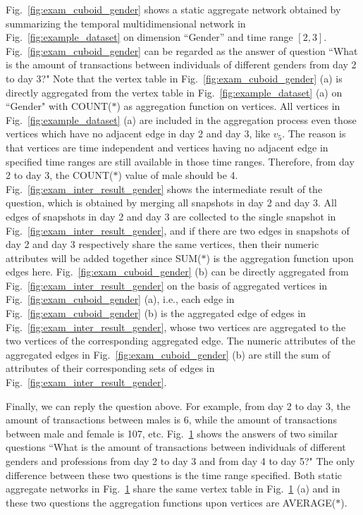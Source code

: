 \documentclass[10pt,journal,compsoc]{IEEEtran}
\begin{document}
{\begin{figure}[t!]
	\vspace*{-0.4cm}
	\label{fig:exam_cuboid_gender_profession}
\end{figure}
\begin{example} \label{exam:cuboid_query}
	Fig.~\ref{fig:exam_cuboid_gender} shows a static aggregate network obtained by summarizing the temporal multidimensional network in Fig.~\ref{fig:example_dataset} on dimension ``Gender'' and time range $ [2,3] $. Fig.~\ref{fig:exam_cuboid_gender} can be regarded as the answer of question ``What is the amount of transactions between individuals of different genders from day 2 to day 3?" Note that the vertex table in Fig.~\ref{fig:exam_cuboid_gender} (a) is directly aggregated from the vertex table in Fig.~\ref{fig:example_dataset} (a) on ``Gender" with COUNT($\ast$) as aggregation function on vertices. All vertices in Fig.~\ref{fig:example_dataset} (a) are included in the aggregation process even those vertices which have no adjacent edge in day 2 and day 3, like $ v_5 $. The reason is that vertices are time independent and vertices having no adjacent edge in specified time ranges are still available in those time ranges. Therefore, from day 2 to day 3, the COUNT($\ast$) value of male should be 4. Fig.~\ref{fig:exam_inter_result_gender} shows the intermediate result of the question, which is obtained by merging all snapshots in day 2 and day 3. All edges of snapshots in day 2 and day 3 are collected to the single snapshot in Fig.~\ref{fig:exam_inter_result_gender}, and if there are two edges in snapshots of day 2 and day 3 respectively share the same vertices, then their numeric attributes will be added together since SUM($\ast$) is the aggregation function upon edges here. Fig.~\ref{fig:exam_cuboid_gender} (b) can be directly aggregated from Fig.~\ref{fig:exam_inter_result_gender} on the basis of aggregated vertices in Fig.~\ref{fig:exam_cuboid_gender} (a), i.e., each edge in Fig.~\ref{fig:exam_cuboid_gender} (b) is the aggregated edge of edges in Fig.~\ref{fig:exam_inter_result_gender}, whose two vertices are aggregated to the two vertices of the corresponding aggregated edge. The numeric attributes of the aggregated edges in Fig.~\ref{fig:exam_cuboid_gender} (b) are still the sum of attributes of their corresponding sets of edges in Fig.~\ref{fig:exam_inter_result_gender}.
	
	Finally, we can reply the question above. For example, from day 2 to day 3, the amount of transactions between males is 6, while the amount of transactions between male and female is 107, etc. Fig.~\ref{fig:exam_cuboid_gender_profession} shows the answers of two similar questions ``What is the amount of transactions between individuals of different genders and professions from day 2 to day 3 and from day 4 to day 5?" The only difference between these two questions is the time range specified. Both static aggregate networks in Fig.~\ref{fig:exam_cuboid_gender_profession} share the same vertex table in Fig.~\ref{fig:exam_cuboid_gender_profession} (a) and in these two questions the aggregation functions upon vertices are AVERAGE($\ast$).
\end{example}


}
\end{document}
